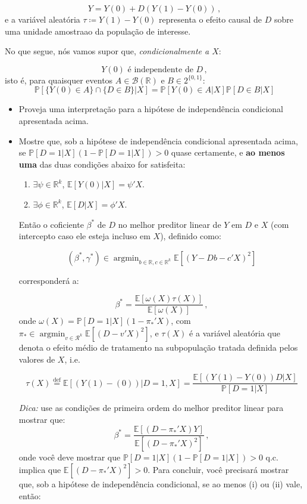 \documentclass[10pt,a4paper]{article}
\begin{document}
$$Y = Y(0) + D(Y(1)-Y(0))\, ,$$
e a variável aleatória $\tau \coloneqq Y(1)-Y(0)$ representa o efeito causal de  $D$ sobre uma unidade amostraao da população de interesse. 

No que segue, nós vamos supor que, \emph{condicionalmente a $X$}:

$$Y(0) \text{ é independente de } D\, ,$$
isto é, para quaisquer eventos $A \in \mathcal{B}(\mathbb{R})$ e $B \in 2^{\{0,1\}}$:
$$\mathbb{P}[\{Y(0) \in A\}\cap \{D \in B\}|X ]=\mathbb{P}[Y(0) \in A|X] \mathbb{P}[D \in B|X]$$

\begin{itemize}
	\item[a] Proveja uma interpretação para a hipótese de independência condicional apresentada acima.
	\item[b]  Mostre que, sob a hipótese de independência condicional apresentada acima, se  $\mathbb{P}[D=1|X](1-\mathbb{P}[D=1|X])>0$ quase certamente, e \textbf{ao menos uma} das duas condições abaixo for satisfeita:
	
	\begin{enumerate}
		\item[i] $\exists \psi \in \mathbb{R}^k$, $\mathbb{E}[Y(0)|X] = \psi'X$.
		\item[ii] $\exists \phi \in \mathbb{R}^k$, $\mathbb{E}[D|X] = \phi'X$.
	\end{enumerate}
	
	Então o coficiente $\beta^*$ de $D$ no melhor preditor linear de $Y$ em $D$ e $X$ (com intercepto caso ele esteja incluso em $X$), {definido como}:
	
	$$(\beta^*, \gamma^*) \in \operatorname{argmin}_{b \in \mathbb{R}, c \in \mathbb{R}^k}\mathbb{E}[(Y-Db - c'X)^2]$$
	
	corresponderá a:
	
	$$\beta^* =\frac{\mathbb{E}[ \omega(X) \tau(X)]}{\mathbb{E}[\omega(X)]}\, ,$$
	onde $\omega(X) = \mathbb{P}[D=1|X](1-\pi_*'X)$, com $\pi_* \in \operatorname{argmin}_{v \in \mathcal{R}^k}\mathbb{E}[(D-v'X)^2]$,  e $\tau(X)$ é a variável aleatória que denota o efeito médio de tratamento na subpopulação tratada definida pelos valores de $X$, i.e.
	
	$$\tau(X) \overset{\text{def}}{=} \mathbb{E}[(Y(1)-(0))|D=1,X] = \frac{\mathbb{E}[(Y(1)-Y(0))D|X]}{\mathbb{P}[D=1|X]}$$
	
	\textit{Dica:} use as condições de primeira ordem do melhor preditor linear para mostrar que:
	$$\beta^* = \frac{\mathbb{E}[(D-\pi_*'X)Y]}{\mathbb{E}[(D-\pi_*'X)^2]}\, ,$$
	onde você deve mostrar que $\mathbb{P}[D=1|X](1-\mathbb{P}[D=1|X]) > 0$ q.c. implica que $\mathbb{E}[(D-\pi_*'X)^2] > 0$. Para concluir, você precisará mostrar que, sob a hipótese de independência condicional, se ao menos (i) ou (ii) vale, então:
	

\end{itemize}
\end{document}
